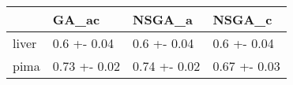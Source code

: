 \begin{tabular}{llll}
\toprule
{} &         GA\_ac &        NSGA\_a &        NSGA\_c \\
\midrule
liver &   0.6 +- 0.04 &   0.6 +- 0.04 &   0.6 +- 0.04 \\
pima  &  0.73 +- 0.02 &  0.74 +- 0.02 &  0.67 +- 0.03 \\
\bottomrule
\end{tabular}
